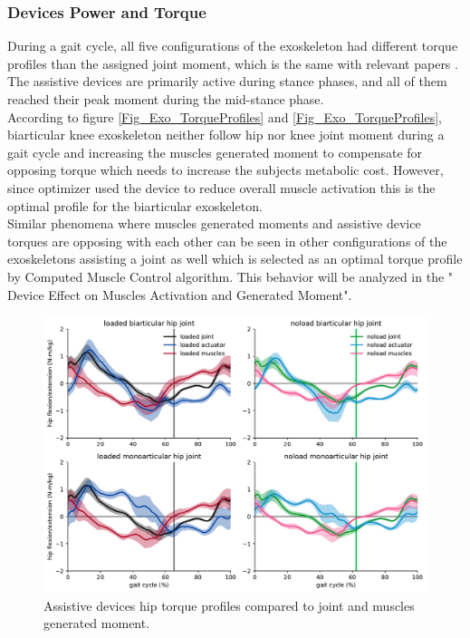 \documentclass[10pt,letterpaper]{article}
\begin{document}
\subsubsection*{Devices Power and Torque}
During a gait cycle, all five configurations of the exoskeleton had different torque profiles than the assigned joint moment, which is the same with relevant papers \cite{2,93}. The assistive devices are primarily active during stance phases, and all of them reached their peak moment during the mid-stance phase.\\
According to figure \ref{Fig_Exo_TorqueProfiles} and \ref{Fig_Exo_TorqueProfiles}, biarticular knee exoskeleton neither follow hip nor knee joint moment during a gait cycle and increasing the muscles generated moment to compensate for opposing torque which needs to increase the subjects metabolic cost. However, since optimizer used the device to reduce overall muscle activation this is the optimal profile for the biarticular exoskeleton.\\ Similar phenomena where muscles generated moments and assistive device torques are opposing with each other can be seen in other configurations of the exoskeletons assisting a joint as well which is selected as an optimal torque profile by Computed Muscle Control algorithm. This behavior will be analyzed in the " Device Effect on Muscles Activation and Generated Moment".\\
\begin{figure}[h]
	\hspace*{-2cm}   
	\centering
	\includegraphics[scale=0.40]{Ideal_Exo_MonovsBi_Figures/Exoskeletons_Hip_Torque.pdf}
	\caption{Assistive devices hip torque profiles compared to joint and muscles generated moment.}
	\label{Fig_IdealExo_Hip_Torque}
\end{figure}
\end{document}
